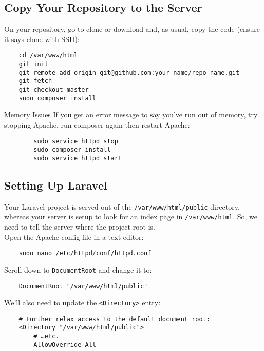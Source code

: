 \subsection{Copy Your Repository to the Server}

On your repository, go to clone or download and, as usual, copy the code (ensure it says clone with SSH):

\begin{verbatim}
    cd /var/www/html
    git init
    git remote add origin git@github.com:your-name/repo-name.git
    git fetch
    git checkout master
    sudo composer install
\end{verbatim}


\begin{infobox}{Memory Issues}
    If you get an error message to say you've run out of memory, try stopping Apache, run composer again then restart Apache:

    \begin{verbatim}
        sudo service httpd stop
        sudo composer install
        sudo service httpd start
    \end{verbatim}
\end{infobox}


\subsection{Setting Up Laravel}

Your Laravel project is served out of the \texttt{/var/www/html/public} directory, whereas your server is setup to look for an index page in \texttt{/var/www/html}. So, we need to tell the server where the project root is.
\\

Open the Apache config file in a text editor:

\begin{verbatim}
    sudo nano /etc/httpd/conf/httpd.conf
\end{verbatim}

Scroll down to \texttt{DocumentRoot} and change it to:

\begin{verbatim}
    DocumentRoot "/var/www/html/public"
\end{verbatim}

We'll also need to update the \texttt{<Directory>} entry:

\begin{verbatim}
    # Further relax access to the default document root:
    <Directory "/var/www/html/public">
        # …etc.
        AllowOverride All
\end{verbatim}

